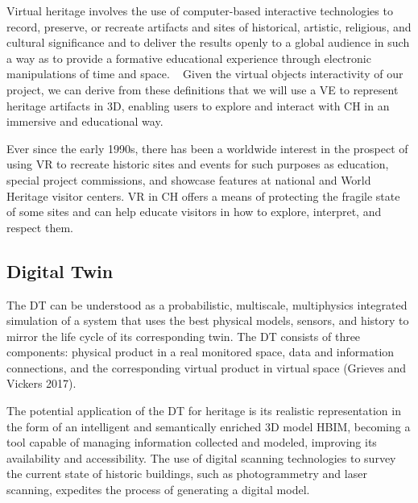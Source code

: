 Virtual heritage involves the use of computer-based interactive technologies to record, preserve, or recreate 
artifacts and sites of historical, artistic, religious, and cultural significance and to deliver 
the results openly to a global audience in such a way as to provide a formative educational 
experience through electronic manipulations of time and space. ~\cite{848434} Given the virtual objects interactivity of our project, we can derive from these definitions that we will use a \gls{VE} to represent heritage artifacts 
in \gls{3D}, enabling users to explore and interact with \gls{CH} in an immersive and educational way.

Ever since the early 1990s, there has been a worldwide interest in the prospect of using \gls{VR} to 
recreate historic sites and events for such purposes as education, special project commissions, 
and showcase features at national and World Heritage visitor centers. \gls{VR} in \gls{CH} offers a means of protecting the fragile state of some sites and can help educate visitors in how to explore, interpret, and respect them. ~\cite{hale2014handbook}




\subsection{Digital Twin}
\label{sec:digital_twin}


The \gls{DT} can be understood as a probabilistic, multiscale,
multiphysics integrated simulation of a system that uses the best physical models,
sensors, and history to mirror the life cycle of its corresponding twin. 
The \gls{DT} consists of three components: physical product in a real monitored
space, data and information connections, and the corresponding virtual product
in virtual space (Grieves and Vickers 2017).


 The potential application of the \gls{DT} for heritage is its realistic
 representation in the form of an intelligent and semantically enriched \gls{3D} model
\gls{HBIM}, becoming a tool capable of managing information collected and modeled,
 improving its availability and accessibility.
 The use of digital scanning technologies to survey the current state of historic
 buildings, such as photogrammetry and laser scanning, expedites the process
 of generating a digital model.~\cite{dezen2020towards}

